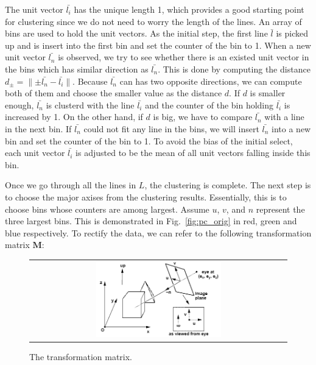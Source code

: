 \documentclass[12pt,letterpaper]{article}
\newcommand{\Fig}[1]{Fig.~\ref{fig:#1}}
\begin{document}
The unit vector $\bar{l_i}$ has the unique length 1, which provides a good starting point 
for clustering since we do not need to worry the length of the lines. 
An array of bins are used to hold the unit vectors.
As the initial step, the first line $\bar{l}$ is picked up and is insert into the 
first bin and set the counter of the bin to 1.
When a new unit vector $\bar{l_n}$ is observed, we try to see whether there is an
existed unit vector in the bins which has similar direction as $\bar{l_n}$. This is
done by computing the distance $d_{\pm}=\parallel \pm\bar{l_n} - \bar{l_i} \parallel$.
Because $\bar{l_n}$ can has two opposite directions, we can compute both of them and
choose the smaller value as the distance $d$. If $d$ is smaller enough, $\bar{l_n}$
is clusterd with the line $\bar{l_i}$ and the counter of the bin holding $\bar{l_i}$
is increased by 1. On the other hand, if $d$ is big, we have to compare $\bar{l_n}$
with a line in the next bin. If $\bar{l_n}$ could not fit any line in the bins, we
will insert $\bar{l_n}$ into a new bin and set the counter of the bin to 1. 
To avoid the bias of the initial select, each unit vector $\bar{l_i}$ is
adjusted to be the mean of all unit vectors falling inside this bin. 

Once we go through all the lines in $L$, the clustering is complete. 
The next step is to choose the major axises from the clustering results. 
Essentially, this is to choose bins whose counters are among largest. 
Assume $u$, $v$, and $n$ represent the three largest bins. This is demonstrated in
\Fig{pc_orig} in red, green and blue respectively. To rectify the data,
we can refer to the following transformation matrix $\mathbf{M}$:
\begin{figure}[htbp]
\begin{center}
\begin{tabular}{c}
\includegraphics[width=0.5\textwidth]{point_cloud_rect_matrix.png}
\end{tabular}
\end{center}
\caption{ The transformation matrix. }
\label{fig:pc_rect_matrix}
\end{figure}
\end{document}
